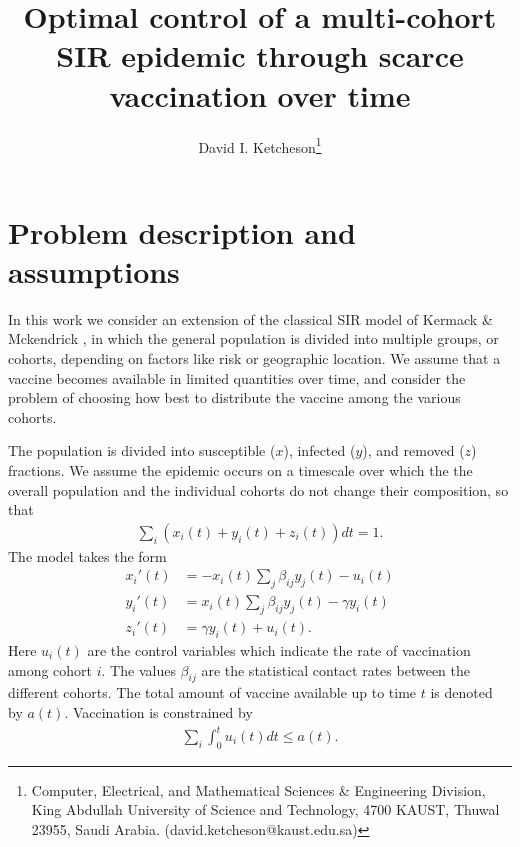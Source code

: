 \documentclass[english,12pt,letter]{article}
\begin{document}
\title{Optimal control of a multi-cohort SIR epidemic through scarce vaccination over time}
\author{
  David I. Ketcheson\thanks{Computer, Electrical, and Mathematical Sciences \& Engineering Division,
King Abdullah University of Science and Technology, 4700 KAUST, Thuwal
23955, Saudi Arabia. (david.ketcheson@kaust.edu.sa)}
}
\maketitle


\section{Problem description and assumptions}
In this work we consider an extension of the
classical SIR model of Kermack \& Mckendrick \cite{kermack1927contribution}, in which
the general population is divided into multiple groups, or cohorts, depending on
factors like risk or geographic location.  We assume that a vaccine becomes
available in limited quantities over time, and consider the problem of choosing
how best to distribute the vaccine among the various cohorts.

The population is divided into susceptible ($x$), infected ($y$), and removed ($z$) fractions.
We assume the epidemic occurs on a timescale over which the the overall population
and the individual cohorts do not change their composition, so that
\begin{align}
    \sum_i (x_i(t) + y_i(t) + z_i(t))dt = 1.
\end{align}
The model takes the form
\begin{subequations} \label{SIR}
\begin{align} 
    x_i'(t) & = -x_i(t) \sum_j \beta_{ij}  y_j(t) - u_i(t) \\
    y_i'(t) & = x_i(t) \sum_j \beta_{ij} y_j(t) - \gamma y_i(t) \label{eq:y} \\
    z_i'(t) & = \gamma y_i(t) + u_i(t) \label{eq:z}.
\end{align}
\end{subequations}
Here $u_i(t)$ are the control variables which indicate the rate of vaccination
among cohort $i$.  The values $\beta_{ij}$ are the statistical contact rates
between the different cohorts.
The total amount of vaccine available up to time $t$ is denoted
by $a(t)$.  Vaccination is constrained by
\begin{align}
    \sum_i \int_0^t u_i(t) dt \le a(t).
\end{align}
\end{document}
